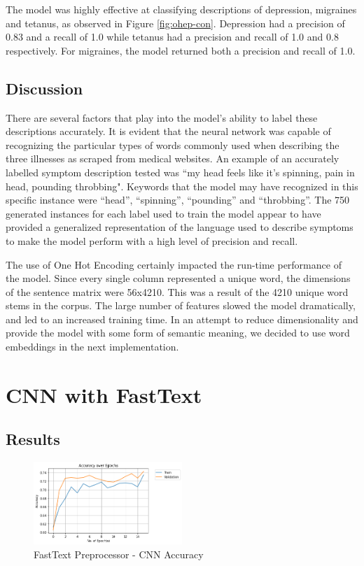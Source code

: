 \documentclass[12pt]{report}
\begin{document}
The model was highly effective at classifying descriptions of
depression, migraines and tetanus, as observed in Figure \ref{fig:ohep-con}.
Depression had a precision of 0.83 and a
recall of 1.0 while tetanus had a precision and recall of 1.0 and 0.8 respectively.
For migraines, the model returned both a precision and recall of 1.0.

\subsection{Discussion}
There are several factors that play into the model's ability to label these descriptions
accurately. It is evident that the neural network was capable of recognizing the particular
types of words commonly used when describing the three illnesses as scraped from medical
websites. An example of an accurately labelled symptom description tested was ``my head
feels like it's spinning, pain in head, pounding throbbing". Keywords that the model
may have recognized in this specific instance were “head”, “spinning”, “pounding” and
“throbbing”. The 750 generated instances for each label used to train the model appear to
have provided a generalized representation of the language used to describe symptoms to make
the model perform with a high level of precision and recall.

The use of One Hot Encoding certainly impacted the run-time performance of the model.
Since every single column represented a unique word, the dimensions of the sentence matrix
were 56x4210. This was a result of the 4210 unique word stems in the corpus. The large
number of features slowed the model dramatically, and led to an increased training time.
In an attempt to reduce dimensionality and provide the model with some form of semantic
meaning, we decided to use word embeddings in the next implementation.

\section{CNN with FastText}

\subsection{Results}

\begin{figure}[H]
	\centering
	\includegraphics[width=0.5\textwidth]{accuracy-1.png}
	\caption{FastText Preprocessor - CNN Accuracy}
	\label{fig:ft-acc}
\end{figure}
\end{document}
